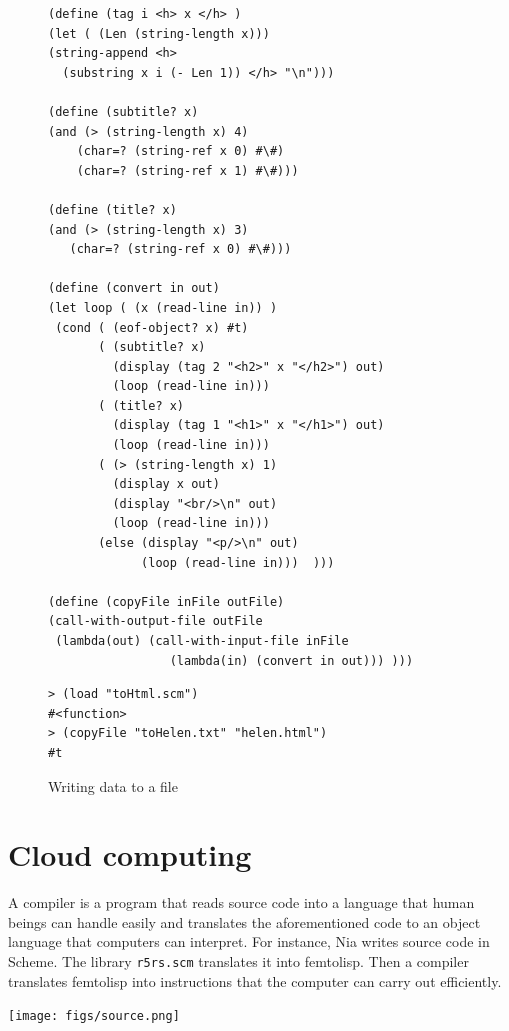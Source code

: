 \documentclass[a4paper,12pt]{book}
\newenvironment{fmpage}[1]
           {\begin{lrbox}{\fmbox}\begin{minipage}{#1}}
           {\end{minipage}\end{lrbox}\fbox{\usebox{\fmbox}}}
\begin{document}
\begin{figure}[!h]
\begin{fmpage}{\linewidth}
\begin{verbatim}
(define (tag i <h> x </h> )
(let ( (Len (string-length x)))
(string-append <h>
  (substring x i (- Len 1)) </h> "\n")))

(define (subtitle? x)
(and (> (string-length x) 4)
    (char=? (string-ref x 0) #\#)
    (char=? (string-ref x 1) #\#)))

(define (title? x)
(and (> (string-length x) 3)
   (char=? (string-ref x 0) #\#)))

(define (convert in out)
(let loop ( (x (read-line in)) )
 (cond ( (eof-object? x) #t)
       ( (subtitle? x)
         (display (tag 2 "<h2>" x "</h2>") out)
         (loop (read-line in)))
       ( (title? x)
         (display (tag 1 "<h1>" x "</h1>") out)
         (loop (read-line in)))
       ( (> (string-length x) 1)
         (display x out)
         (display "<br/>\n" out)
         (loop (read-line in)))
       (else (display "<p/>\n" out)
             (loop (read-line in)))  )))

(define (copyFile inFile outFile)
(call-with-output-file outFile
 (lambda(out) (call-with-input-file inFile
                 (lambda(in) (convert in out))) )))
\end{verbatim}
\end{fmpage}

\begin{fmpage}{\linewidth}
\begin{verbatim}
> (load "toHtml.scm")
#<function>
> (copyFile "toHelen.txt" "helen.html")
#t
\end{verbatim}
\end{fmpage}
\caption{Writing data to a file}
\label{wrtFile}
\end{figure}

\chapter{Cloud computing}\label{cloud-computing}
A compiler is a program that reads
source code into a language that
human beings can handle easily
and translates the aforementioned
code to an object language that
computers can interpret.
For instance, Nia writes source code
in   Scheme.
The library \verb|r5rs.scm| translates
it into femtolisp.
Then a compiler translates femtolisp
into instructions that the
computer can carry out efficiently.

\texttt{[image: figs/source.png]}
\end{document}
